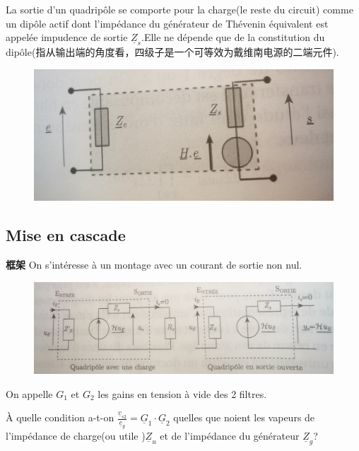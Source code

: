 \documentclass[12pt]{book}
\theoremstyle{definition}\newtheorem{dfn}{Définition}[chapter]
\theoremstyle{plain}\newtheorem{thm}{Théorème}[chapter]
\theoremstyle{plain}\newtheorem{prp}{Proposition}[chapter]
\theoremstyle{plain}\newtheorem{lem}{\bf Lemme}[chapter]
\theoremstyle{plain}\newtheorem{axm}{\bf Axiome}[chapter]
\theoremstyle{plain}\newtheorem{lmm}{\bf Lemme}[chapter]
\theoremstyle{plain}\newtheorem{cor}{\bf Corollaire}[chapter]
\theoremstyle{remark}\newtheorem{rem}{Remarque}[chapter]
\begin{document}
La sortie d'un quadripôle se comporte pour la charge(le reste du circuit) comme un dipôle actif dont l'impédance du générateur de Thévenin équivalent est appelée impudence de sortie $\underline{Z}_s$.Elle ne dépende que de la constitution du dipôle(指从输出端的角度看，四级子是一个可等效为戴维南电源的二端元件).
\begin{figure}[H]
	\centering
	\includegraphics[scale=0.15]{Filtrage//11}
\end{figure}
\subsection{Mise en cascade}
\begin{framed}{\textbf{框架}}
 On s'intéresse à un montage avec un courant de sortie non nul.
\end{framed}
\begin{figure}[H]
	\centering
	\includegraphics[scale=0.15]{Filtrage//12}
\end{figure}
On appelle $G_1$ et $G_2$ les gains en tension à vide des 2 filtres.
\begin{framed}
À quelle condition a-t-on $\frac{\underline{v}_{s2}}{\underline{e}_g}=\underline{G}_1\cdot\underline{G}_2$ {\color{red}quelles que noient} les vapeurs de l'impédance de charge(ou utile )$\underline{Z}_u$ et de l'impédance du générateur $\underline{Z}_g$?
\end{framed}
\end{document}
